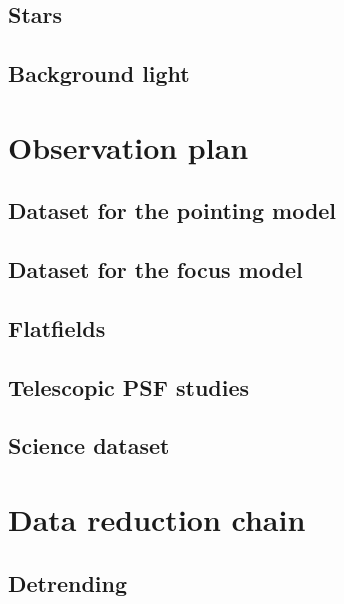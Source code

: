 \documentclass[\docopts]{\docclass}
\begin{document}
\subsection{Stars}
\label{sec:stars}


\subsection{Background light}
\label{sec:background}


\section{Observation plan}
\label{sec:plan}

\subsection{Dataset for the pointing model}
\label{sec:pointingmodel}

\subsection{Dataset for the focus model}
\label{sec:focusmodel}

\subsection{Flatfields}
\label{sec:flatfields}


\subsection{Telescopic PSF studies}


\subsection{Science dataset}
\label{sec:data}

\section{Data reduction chain}
\label{sec:dataanalysis}

\subsection{Detrending}
\label{sec:detrending}
\end{document}
